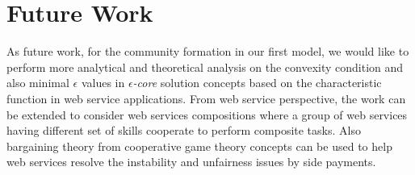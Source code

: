 



\section{Future Work}

As future work, for the community formation in our first model, we would like to perform more analytical and theoretical analysis on the convexity condition and also minimal
$\epsilon$ values in \emph{$\epsilon$-core} solution concepts based on the characteristic function in web service applications. From web service perspective, the work can be extended to consider web services compositions where a group of web services having different set of skills cooperate to perform composite tasks. Also bargaining theory from cooperative game theory concepts \cite{RePEc:roc:rocher:554} can be used to help web services resolve the instability and unfairness issues by side payments.

